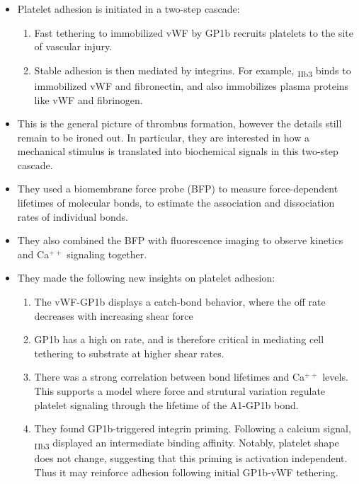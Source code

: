 \documentclass[
10pt, %
letterpaper, %
twocolumn, %
landscape %
]{article}
\newcommand{\inta}[1]{\textalpha\textsubscript{#1}}
\newcommand{\intb}[1]{\textbeta\textsubscript{#1}}
\begin{document}
\begin{itemize}
\item Platelet adhesion is initiated in a two-step cascade:
  \begin{enumerate}
  \item Fast tethering to immobilized vWF by GP1b\inta{} recruits
    platelets to the site of vascular injury.
  \item Stable adhesion is then mediated by integrins. For example,
    \inta{IIb}\intb{3} binds to immobilized vWF and fibronectin, and
    also immobilizes plasma proteins like vWF and fibrinogen.
  \end{enumerate}
\item This is the general picture of thrombus formation, however the
  details still remain to be ironed out. In particular, they are
  interested in how a mechanical stimulus is translated into
  biochemical signals in this two-step cascade.
\item They used a biomembrane force probe (BFP) to measure
  force-dependent lifetimes of molecular bonds, to estimate the
  association and dissociation rates of individual bonds.
\item They also combined the BFP with fluorescence imaging to observe
  kinetics and Ca$^{++}$ signaling together.
\item They made the following new insights on platelet adhesion:
  \begin{enumerate}
  \item The vWF-GP1b\inta{} displays a catch-bond behavior, where the
    off rate decreases with increasing shear force
  \item GP1b\inta{} has a high on rate, and is therefore critical in
    mediating cell tethering to substrate at higher shear rates.
  \item There was a strong correlation between bond lifetimes and
    Ca$^{++}$ levels. This supports a model where force and strutural
    variation regulate platelet signaling through the lifetime of the
    A1-GP1b bond.
  \item They found GP1b-triggered integrin priming. Following a
    calcium signal, \inta{IIb}\intb{3} displayed an intermediate
    binding affinity. Notably, platelet shape does not change,
    suggesting that this priming is activation independent. Thus it
    may reinforce adhesion following initial GP1b-vWF tethering.
  \end{enumerate}
\end{itemize}
\end{document}
